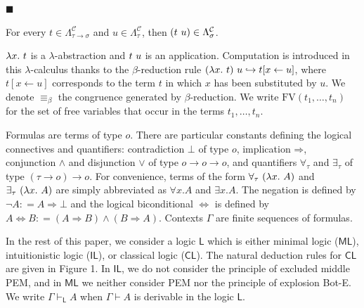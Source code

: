  
 
\par\noindent  $\blacksquare$ 
 
For every $t\in\Lambda^{\mathcal{C}}_{\tau\rightarrow\sigma}$ and $u\in\Lambda^{\mathcal{C}}_{\tau}$, then $(t\leavevmode\nobreak\ u)\in\Lambda^{\mathcal{C}}_{\sigma}$.\par
 
 
  
$\lambda x.\leavevmode\nobreak\ t$ is a $\lambda$-abstraction and $t\leavevmode\nobreak\ u$ is an application. Computation is introduced in this $\lambda$-calculus thanks to the $\beta$-reduction rule $(\lambda x.\leavevmode\nobreak\ t)\leavevmode\nobreak\ u\hookrightarrow t[x\leftarrow u]$, where $t[x\leftarrow u]$ corresponds to the term $t$ in which $x$ has been substituted by $u$. We denote $\equiv_{\beta}$ the congruence generated by $\beta$-reduction. We write $\text{{FV}}(t_{1},\ldots,t_{n})$ for the set of free variables that occur in the terms $t_{1},\ldots,t_{n}$.\par
 
 
 
Formulas are terms of type $o$. There are particular constants defining the logical connectives and quantifiers: contradiction $\bot$ of type $o$, implication $\mathbin{\Rightarrow}$, conjunction $\mathbin{\wedge}$ and disjunction $\mathbin{\vee}$ of type $o\rightarrow o\rightarrow o$, and quantifiers ${\forall}_{\tau}$ and ${\exists}_{\tau}$ of type $(\tau\rightarrow o)\rightarrow o$. For convenience, terms of the form ${\forall}_{\tau}\leavevmode\nobreak\ (\lambda x.\leavevmode\nobreak\ A)$ and ${\exists}_{\tau}\leavevmode\nobreak\ (\lambda x.\leavevmode\nobreak\ A)$ are simply abbreviated as ${\forall}x.A$ and ${\exists}x.A$. The negation is defined by $\neg A\mathrel{\mathop{:}}=A\mathbin{\Rightarrow}\bot$ and the logical biconditional $\Leftrightarrow$ is defined by $A\Leftrightarrow B\mathrel{\mathop{:}}=(A\mathbin{\Rightarrow}B)\mathbin{\wedge}(B\mathbin{\Rightarrow}A)$. Contexts $\Gamma$ are finite sequences of formulas.\par
 
 
 
In the rest of this paper, we consider a logic $\mathsf{L}$ which is either minimal logic ($\mathsf{ML}$), intuitionistic logic ($\mathsf{IL}$), or classical logic ($\mathsf{CL}$). The natural deduction rules for $\mathsf{CL}$ are given in Figure 1. In $\mathsf{IL}$, we do not consider the principle of excluded middle PEM, and in $\mathsf{ML}$ we neither consider PEM nor the principle of explosion Bot-E. We write $\Gamma\vdash_{\mathsf{L}}A$ when $\Gamma\vdash A$ is derivable in the logic $\mathsf{L}$.\par
 
